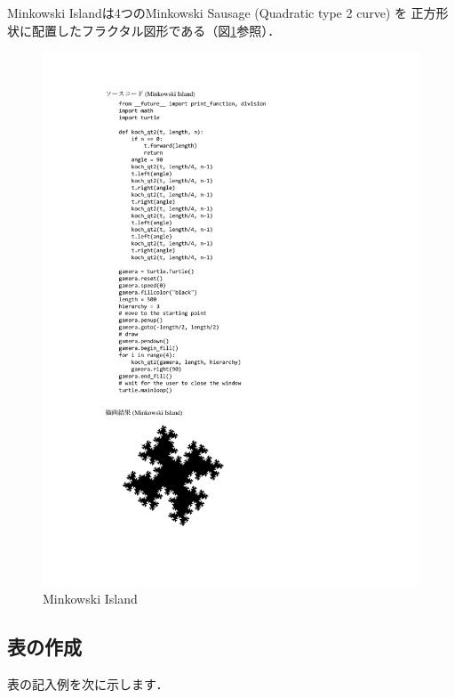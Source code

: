 \documentclass[10pt, a4paper, twocolumn]{jarticle}
\begin{document}
Minkowski Islandは4つのMinkowski Sausage (Quadratic type 2 curve) を
正方形状に配置したフラクタル図形である（図\ref{fig:fractal}参照）．
%
\begin{figure}[b]
	\begin{center}
		\includegraphics[scale=1]{figure/fractal.pdf}
	\end{center}
	\vspace{-12pt} %
	\caption{Minkowski Island}
	\label{fig:fractal}
\end{figure}
%
\newpage

\subsection{表の作成}
表の記入例を次に示します．
\end{document}
